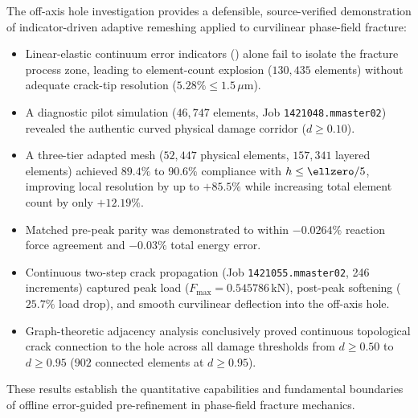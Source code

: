 The off-axis hole investigation provides a defensible, source-verified demonstration of indicator-driven adaptive remeshing applied to curvilinear phase-field fracture:
\begin{itemize}
  \item Linear-elastic continuum error indicators (\MISESERI) alone fail to isolate the fracture process zone, leading to element-count explosion ($130{,}435$ elements) without adequate crack-tip resolution ($5.28\% \le 1.5\,\mu\mathrm{m}$).
  \item A diagnostic pilot simulation ($46{,}747$ elements, Job \texttt{1421048.mmaster02}) revealed the authentic curved physical damage corridor ($d \ge 0.10$).
  \item A three-tier adapted mesh ($52{,}447$ physical elements, $157{,}341$ layered elements) achieved $89.4\%$ to $90.6\%$ compliance with $h \le \ellzero / 5$, improving local resolution by up to $+85.5\%$ while increasing total element count by only $+12.19\%$.
  \item Matched pre-peak parity was demonstrated to within $-0.0264\%$ reaction force agreement and $-0.03\%$ total energy error.
  \item Continuous two-step crack propagation (Job \texttt{1421055.mmaster02}, 246 increments) captured peak load ($F_{\max} = 0.545786\,\mathrm{kN}$), post-peak softening ($25.7\%$ load drop), and smooth curvilinear deflection into the off-axis hole.
  \item Graph-theoretic adjacency analysis conclusively proved continuous topological crack connection to the hole across all damage thresholds from $d \ge 0.50$ to $d \ge 0.95$ ($902$ connected elements at $d \ge 0.95$).
\end{itemize}
These results establish the quantitative capabilities and fundamental boundaries of offline error-guided pre-refinement in phase-field fracture mechanics.
